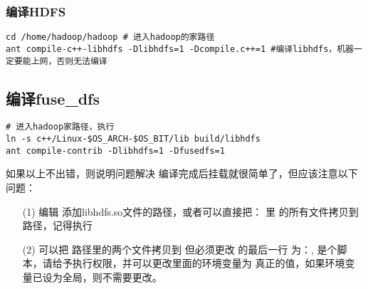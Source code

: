 \documentclass{article}
\begin{document}
\subsubsection{编译HDFS}
\begin{verbatim}
cd /home/hadoop/hadoop # 进入hadoop的家路径
ant compile-c++-libhdfs -Dlibhdfs=1 -Dcompile.c++=1 #编译libhdfs，机器一定要能上网，否则无法编译
\end{verbatim}

\subsection{编译fuse\_dfs}
\begin{verbatim}
# 进入hadoop家路径，执行
ln -s c++/Linux-$OS_ARCH-$OS_BIT/lib build/libhdfs 
ant compile-contrib -Dlibhdfs=1 -Dfusedfs=1 
\end{verbatim}

\textsf{如果以上不出错，则说明问题解决}
编译完成后挂载就很简单了，但应该注意以下问题：
\begin{itemize}
\item[(1)] 编辑 添加libhdfs.so文件的路径，或者可以直接把： 里
的所有文件拷贝到路径，记得执行
\item[(2)] 可以把 路径里的两个文件拷贝到 但必须更改
的最后一行 为：,  是个脚本，请给予执行权限，并可以更改里面的环境变量为
真正的值，如果环境变量已设为全局，则不需要更改。
\end{itemize}
\end{document}
